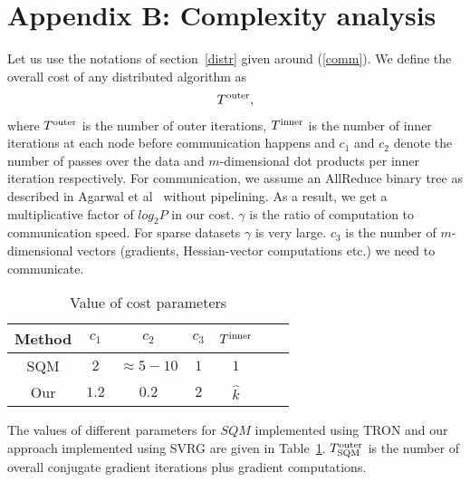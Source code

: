 \def\C{C}
\def\Ccomp{C^{\rm Comp}}
\def\Ccomm{C^{\rm Comm}}
\def\Csqm{C_{\rm SQM}}
\def\Csvrg{C_{\rm SVRG}}
\def\Ccompsqm{C^{\rm Comp}_{\rm SQM}}
\def\Ccommsqm{C^{\rm Comm}_{\rm SQM}}
\def\Ccompsvrg{C^{\rm Comp}_{\rm SVRG}}
\def\Ccommsvrg{C^{\rm Comm}_{\rm SVRG}}
\def\Tout{T^{\rm outer}}
\def\Tin{T^{\rm inner}}
\def\Toutsqm{T^{\rm outer}_{\rm SQM}}
\def\Toutsvrg{T^{\rm outer}_{\rm SVRG}}

\section{Appendix B: Complexity analysis}
\label{proofs-complexity}
Let us use the notations of section~\ref{distr} given around (\ref{comm}). We define the overall cost of any distributed algorithm as
\begin{eqnarray}
[(c_1\frac{nz}{p} + c_2m)\Tin + c_3 \gamma m \log_2 P]\Tout,
\label{costanal}
\end{eqnarray}
where $\Tout$ is the number of outer iterations, $\Tin$ is the number of inner iterations at each node before communication happens and  $c_1$ and $c_2$ denote the number of passes over the data and $m$-dimensional dot products per inner iteration respectively. For communication, we assume an AllReduce binary tree as described in Agarwal et al~ without pipelining. As a result, we get a multiplicative factor of $log_2 P$ in our cost. $\gamma$ is the ratio of computation to communication speed. For sparse datasets $\gamma$ is very large. $c_3$ is the number of $m$-dimensional vectors (gradients, Hessian-vector computations etc.) we need to communicate.

\begin{table}[ht]
\caption{Value of cost parameters} %
\centering %
\begin{tabular}{c c c c c c c} %
\hline\hline %
Method & $c_1$ & $c_2$ & $c_3$ & $\Tin$ \\ %
\hline
SQM & $2$ & $\approx 5-10$ & $1$ & $1$ \\
Our & $1.2$ & $0.2$ & $2$ & $\hat{k}$ \\
\hline
\end{tabular}
\label{tab:sqmparams}
\end{table}

The values of different parameters for $SQM$ implemented using TRON and our approach implemented using SVRG are given in Table~\ref{tab:sqmparams}. $\Toutsqm$ is the number of overall conjugate gradient iterations plus gradient computations.

